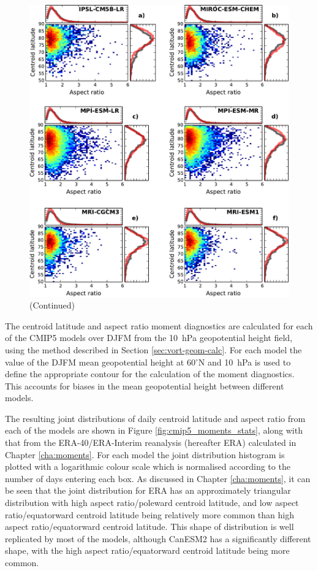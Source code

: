 \begin{figure}[htbp]
 \ContinuedFloat
 \centering
 \noindent\includegraphics[width=\textwidth]{figures/chapter-models/moments_stats2.pdf}
 \caption[]{(Continued)}
\end{figure}


The centroid latitude and aspect ratio moment diagnostics are calculated for
each of the CMIP5 models over DJFM from the 10~hPa geopotential height field,
using the method described in Section \ref{sec:vort-geom-calc}. For each model
the value of the DJFM mean geopotential height at 60$^{\circ}$N and 10~hPa is
used to define the appropriate contour for the calculation of the moment
diagnostics. This accounts for biases in the mean geopotential height between
different models.

The resulting joint distributions of daily centroid latitude and aspect ratio
from each of the models are shown in Figure \ref{fig:cmip5_moments_stats}, along
with that from the ERA-40/ERA-Interim reanalysis (hereafter ERA) calculated in
Chapter \ref{cha:moments}. For each model the joint distribution histogram is
plotted with a logarithmic colour scale which is normalised according to the
number of days entering each box. As discussed in Chapter \ref{cha:moments}, it
can be seen that the joint distribution for ERA has an approximately triangular
distribution with high aspect ratio/poleward centroid latitude, and low aspect
ratio/equatorward centroid latitude being relatively more common than
high aspect ratio/equatorward centroid latitude. This shape of distribution is
well replicated by most of the models, although CanESM2 has a significantly
different shape, with the high aspect ratio/equatorward centroid latitude being
more common. 

